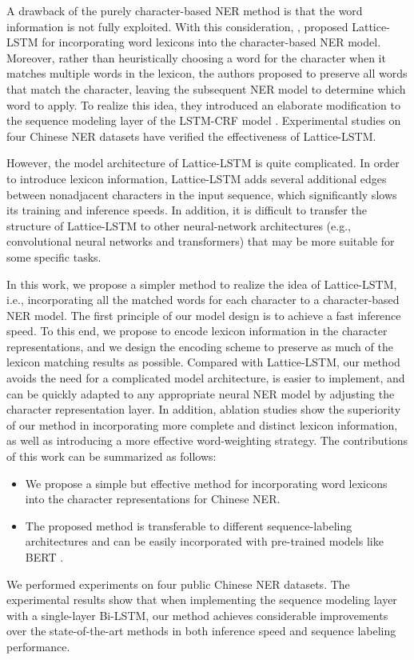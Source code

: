 \documentclass[11pt,a4paper]{article}
\begin{document}
\begin{CJK}{UTF8}{gbsn}
A drawback of the purely character-based NER method is that the word information is not fully exploited. With this consideration, \citeauthor{zhang2018chinese},  proposed Lattice-LSTM for incorporating word lexicons into the character-based NER model. Moreover, rather than heuristically choosing a word for the character when it matches multiple words in the lexicon, the authors proposed to preserve all words that match the character, leaving the subsequent NER model to determine which word to apply. To realize this idea, they introduced an elaborate modification to the sequence modeling layer of the LSTM-CRF model \cite{huang2015bidirectional}. Experimental studies on four Chinese NER datasets have verified the effectiveness of Lattice-LSTM.


However, the model architecture of Lattice-LSTM is quite complicated. In order to introduce lexicon information, Lattice-LSTM adds several additional edges between nonadjacent characters in the input sequence, which significantly slows its training and inference speeds.
In addition, it is difficult to transfer the structure of Lattice-LSTM to other neural-network architectures (e.g., convolutional neural networks and transformers) that may be more suitable for some specific tasks.



In this work, we propose a simpler method to realize the idea of Lattice-LSTM, i.e., incorporating all the matched words for each character to a character-based NER model. The first principle of our model design is to achieve a fast inference speed. To this end, we propose to encode lexicon information in the character representations, and we design the encoding scheme to preserve as much of the lexicon matching results as possible. Compared with Lattice-LSTM, our method avoids the need for a complicated model architecture, is easier to implement, and can be quickly adapted to any appropriate neural NER model by adjusting the character representation layer. 
In addition, ablation studies show the superiority of our method in incorporating more complete and distinct lexicon information, as well as introducing a more effective word-weighting strategy. The contributions of this work can be summarized as follows:
\begin{itemize}
    \item We propose a simple but effective method for incorporating word lexicons into the character representations for Chinese NER.\item The proposed method is transferable to different sequence-labeling architectures and can be easily incorporated with pre-trained models like BERT \cite{devlin2018bert}.
\end{itemize}
We performed experiments on four public Chinese NER datasets.
The experimental results show that when implementing the sequence modeling layer with a single-layer Bi-LSTM, our
method achieves considerable improvements over the state-of-the-art methods in both inference speed and sequence labeling performance. 



\end{CJK}
\end{document}

